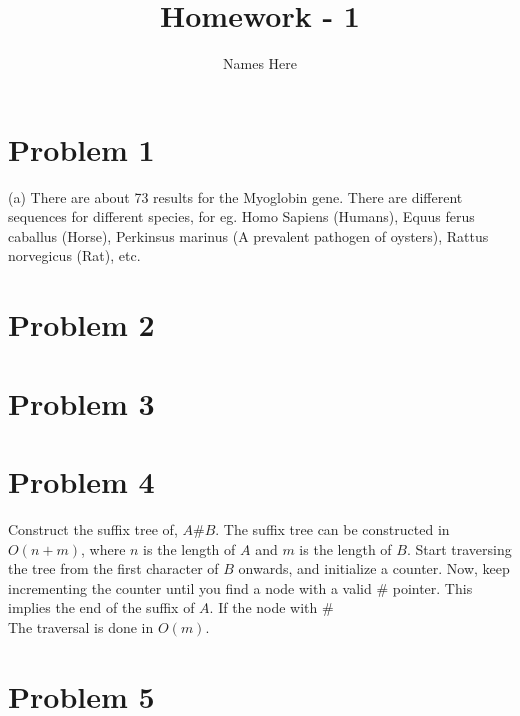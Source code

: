 \documentclass{article}
\title{Homework - 1}
\author{Names Here}
\begin{document}
\maketitle

\clearpage


\section{Problem 1}
(a) There are about 73 results for the Myoglobin gene. There are different sequences for different species, for eg. Homo Sapiens (Humans), Equus ferus caballus (Horse), Perkinsus marinus (A prevalent pathogen of oysters), Rattus norvegicus (Rat), etc.

\clearpage

\section{Problem 2}
\clearpage

\section{Problem 3}
\clearpage

\section{Problem 4}
Construct the suffix tree of, {$ A\#B $}. 
The suffix tree can be constructed in {$ O(n+m) $}, where {$ n $} is 
the length of {$ A $} and {$ m $} is the length of {$ B $}. 
Start traversing the tree from the first character of {$ B $} onwards, 
and initialize a counter. Now, keep incrementing the counter until you 
find a node with a valid \# pointer. This implies the end of the suffix 
of {$ A $}. If the node with \# 
\\
The traversal is done in {$ O(m) $}. 
\clearpage

\section{Problem 5}
\clearpage
\end{document}

